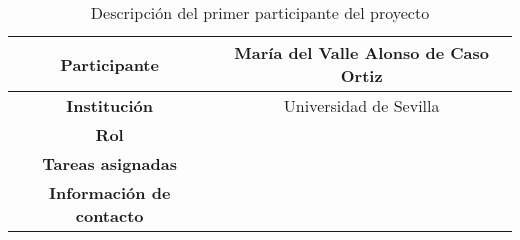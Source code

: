 \begin{table}[H]
    \centering
    \begin{tabular}{|c|c|}
    \hline
    \textbf{Participante} & María del Valle Alonso de Caso Ortiz \\
    \hline
    \textbf{Institución} & Universidad de Sevilla \\
    \hline
    \textbf{Rol} &  \\
    \hline
    \textbf{Tareas asignadas} & \\
    \hline
    \textbf{Información de contacto} & \\
    \hline
    \end{tabular}
\caption{Descripción del primer participante del proyecto}
\label{tab:trazabilidadAlum}
\end{table}